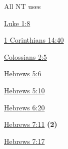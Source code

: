 				\begin{compactdesc}
					\item[All NT uses] \textbf{} %
						\begin{compactdesc}
							\item[{\hyperref[LUKE-1-8]{Luke 1:8}}]
							\item[{\hyperref[1CORINTHIANS-14-40]{1 Corinthians 14:40}}]
							\item[{\hyperref[COLOSSIANS-2-5]{Colossians 2:5}}]
							\item[{\hyperref[HEBREWS-5-6]{Hebrews 5:6}}]
							\item[{\hyperref[HEBREWS-5-10]{Hebrews 5:10}}]
							\item[{\hyperref[HEBREWS-6-20]{Hebrews 6:20}}]
							\item[{\hyperref[HEBREWS-7-11]{Hebrews 7:11}}] \textbf{(2)}
							\item[{\hyperref[HEBREWS-7-17]{Hebrews 7:17}}]
						\end{compactdesc}
				\end{compactdesc}
			
